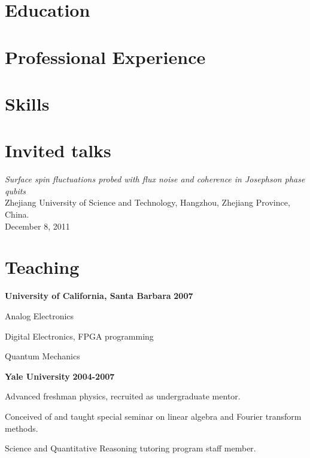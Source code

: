 \documentclass[margin=2cm,line]{res}
\begin{document}
\name{\huge \nameval}
\address{\addressval}
\address{\texttt{\emailval}}

\begin{resume}

\section{\sc Education}


\section{\sc Professional Experience}


\section{\sc Skills}


\section{\sc Invited talks}
\begin{list3}
\item \textit{Surface spin fluctuations probed with flux noise and coherence in Josephson phase qubits}\\
Zhejiang University of Science and Technology, Hangzhou, Zhejiang Province, China.\\ December 8, 2011
\end{list3}

\section{\sc Teaching}
{\bf University of California, Santa Barbara} \hfill{\bf 2007}
\begin{list4}
\item Analog Electronics
\item Digital Electronics, FPGA programming
\item Quantum Mechanics
\end{list4}
{\bf Yale University} \hfill{\bf 2004-2007}
\begin{list4}
\item Advanced freshman physics, recruited as undergraduate mentor.
\item Conceived of and taught special seminar on linear algebra and Fourier transform methods.
\item Science and Quantitative Reasoning tutoring program staff member.
\end{list4}


\end{resume}
\end{document}
